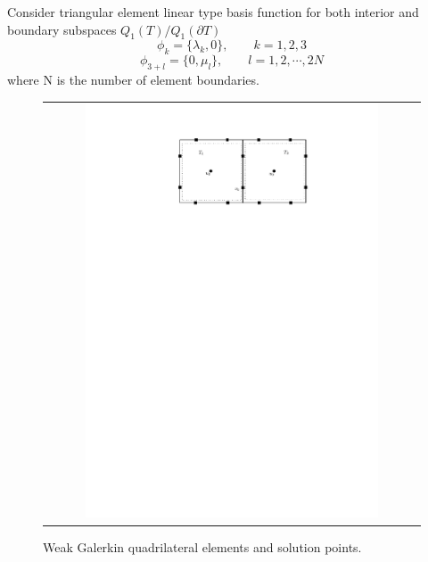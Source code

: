 Consider triangular element linear type basis function for both interior and boundary subspaces $ Q_{1}(T) / Q_{1} (\partial T) $
\begin{equation}
\phi_{k} = \{ \lambda_{k}, 0 \}, \qquad k = 1,2, 3
\end{equation}
\begin{equation}
\phi_{3 + l} = \{ 0, \mu_{l} \}, \qquad l = 1, 2, \cdots , 2N
\end{equation}
where N is the number of element boundaries.
\begin{figure}[h]
	\centering
	\begin{tabular}{c}
		\includegraphics[width=0.8\textwidth]{./pics/quad.pdf}
	\end{tabular}
	\caption{\footnotesize Weak Galerkin quadrilateral elements and solution points.}\label{fig2: quad}
\end{figure}

